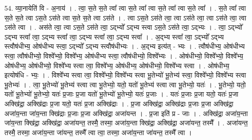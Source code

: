 \documentclass[17pt]{extarticle}
\begin{document}
54. व्या॒नायेति॑ वि - अ॒नाय॑ । . त्वा॒ स॒ते स॒ते त्वा᳚ त्वा स॒ते त्वा᳚ त्वा स॒ते त्वा᳚ त्वा स॒ते त्वा᳚ । . स॒ते त्वा᳚ त्वा स॒ते स॒ते त्वा ऽस॒ते ऽस॑ते त्वा स॒ते स॒ते त्वा ऽस॑ते । . त्वा ऽस॒ते ऽस॑ते त्वा॒ त्वा ऽस॑ते त्वा॒ त्वा ऽस॑ते त्वा॒ त्वा ऽस॑ते त्वा । . अस॑ते त्वा॒ त्वा ऽस॒ते ऽस॑ते त्वा॒ ऽद्भ्यो᳚ ऽद्भ्य स्त्वा ऽस॒ते ऽस॑ते त्वा॒ ऽद्भ्यः । . त्वा॒ ऽद्भ्यो᳚ ऽद्भ्य स्त्वा᳚ त्वा॒ ऽद्भ्य स्त्वा᳚ त्वा॒ ऽद्भ्य स्त्वा᳚ त्वा॒ ऽद्भ्य स्त्वा᳚ । . अ॒द्भ्य स्त्वा᳚ त्वा॒ ऽद्भ्यो᳚ ऽद्भ्य स्त्वौष॑धीभ्य॒ ओष॑धीभ्य स्त्वा॒ ऽद्भ्यो᳚ ऽद्भ्य स्त्वौष॑धीभ्यः । . अ॒द्भ्य इत्य॑त् - भ्यः । . त्वौष॑धीभ्य॒ ओष॑धीभ्य स्त्वा॒ त्वौष॑धीभ्यो॒ विश्वे᳚भ्यो॒ विश्वे᳚भ्य॒ ओष॑धीभ्य स्त्वा॒ त्वौष॑धीभ्यो॒ विश्वे᳚भ्यः । . ओष॑धीभ्यो॒ विश्वे᳚भ्यो॒ विश्वे᳚भ्य॒ ओष॑धीभ्य॒ ओष॑धीभ्यो॒ विश्वे᳚भ्य स्त्वा त्वा॒ विश्वे᳚भ्य॒ ओष॑धीभ्य॒ ओष॑धीभ्यो॒ विश्वे᳚भ्य स्त्वा । . ओष॑धीभ्य॒ इत्योष॑धि - भ्यः॒ । . विश्वे᳚भ्य स्त्वा त्वा॒ विश्वे᳚भ्यो॒ विश्वे᳚भ्य स्त्वा भू॒तेभ्यो॑ भू॒तेभ्य॑ स्त्वा॒ विश्वे᳚भ्यो॒ विश्वे᳚भ्य स्त्वा भू॒तेभ्यः॑ । . त्वा॒ भू॒तेभ्यो॑ भू॒तेभ्य॑ स्त्वा त्वा भू॒तेभ्यो॒ यतो॒ यतो॑ भू॒तेभ्य॑ स्त्वा त्वा भू॒तेभ्यो॒ यतः॑ । . भू॒तेभ्यो॒ यतो॒ यतो॑ भू॒तेभ्यो॑ भू॒तेभ्यो॒ यतः॑ प्र॒जाः प्र॒जा यतो॑ भू॒तेभ्यो॑ भू॒तेभ्यो॒ यतः॑ प्र॒जाः । . यतः॑ प्र॒जाः प्र॒जा यतो॒ यतः॑ प्र॒जा अक्खि॑द्रा॒ अक्खि॑द्राः प्र॒जा यतो॒ यतः॑ प्र॒जा अक्खि॑द्राः । . प्र॒जा अक्खि॑द्रा॒ अक्खि॑द्राः प्र॒जाः प्र॒जा अक्खि॑द्रा॒ अजा॑य॒न्ता जा॑य॒न्ता क्खि॑द्राः प्र॒जाः प्र॒जा अक्खि॑द्रा॒ अजा॑यन्त । . प्र॒जा इति॑ प्र - जाः । . अक्खि॑द्रा॒ अजा॑य॒न्ता जा॑य॒न्ता क्खि॑द्रा॒ अक्खि॑द्रा॒ अजा॑यन्त॒ तस्मै॒ तस्मा॒ अजा॑य॒न्ता क्खि॑द्रा॒ अक्खि॑द्रा॒ अजा॑यन्त॒ तस्मै᳚ । . अजा॑यन्त॒ तस्मै॒ तस्मा॒ अजा॑य॒न्ता जा॑यन्त॒ तस्मै᳚ त्वा त्वा॒ तस्मा॒ अजा॑य॒न्ता जा॑यन्त॒ तस्मै᳚ त्वा । \newline
\end{document}
